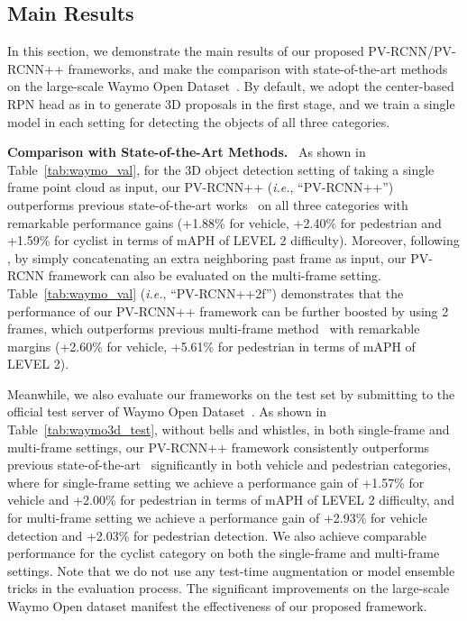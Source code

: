 \documentclass[natbib,twocolumn]{svjour3}          \smartqed  \usepackage{graphicx}
\begin{document}
\subsection{Main Results}\label{sec:main_results}
In this section, we demonstrate the main results of our proposed PV-RCNN/PV-RCNN++ frameworks, and make the comparison with state-of-the-art methods on the large-scale Waymo Open Dataset~\citep{Sun_2020_CVPR}. 
By default, we adopt the center-based RPN head as in \citep{yin2021center} to generate 3D proposals in the first stage, and we train a single model in each setting for detecting the objects of all three categories.


\noindent
\textbf{Comparison with State-of-the-Art Methods.}~
As shown in Table~\ref{tab:waymo_val}, 
for the 3D object detection setting of taking a single frame point cloud as input, 
our PV-RCNN++ (\emph{i.e.}, ``PV-RCNN++'') outperforms previous state-of-the-art works~\citep{yin2021center,shi2020part} 
on all three categories with remarkable performance gains (+1.88\% for vehicle, 
+2.40\% for pedestrian and 
+1.59\% for cyclist
in terms of mAPH of LEVEL 2 difficulty).
Moreover, following \citep{sun2021rsn}, by simply concatenating an extra neighboring past frame as input, our PV-RCNN framework can also be evaluated on the multi-frame setting. Table~\ref{tab:waymo_val} (\emph{i.e.}, ``PV-RCNN++2f'') demonstrates that the performance of our PV-RCNN++ framework can be further boosted by using 2 frames, which outperforms previous multi-frame method~\citep{sun2021rsn} with remarkable margins (+2.60\% for vehicle, +5.61\% for pedestrian in terms of mAPH of LEVEL 2). 
 
Meanwhile, we also evaluate our frameworks on the test set by submitting to the official test server of Waymo Open Dataset~\citep{Sun_2020_CVPR}. As shown in Table~\ref{tab:waymo3d_test}, without bells and whistles, in both single-frame and multi-frame settings, our PV-RCNN++ framework consistently outperforms previous state-of-the-art~\citep{yin2021center} significantly in both vehicle and pedestrian categories, where for single-frame setting we achieve a performance gain of 
+1.57\% for vehicle and +2.00\% for pedestrian 
in terms of mAPH of LEVEL 2 difficulty, and for multi-frame setting we achieve a performance gain of +2.93\% for vehicle detection and +2.03\% for pedestrian detection. 
We also achieve comparable performance for the cyclist category on both the single-frame and multi-frame settings.
Note that we do not use any test-time augmentation or model ensemble tricks in the evaluation process. 
The significant improvements on the large-scale Waymo Open dataset manifest the effectiveness of our proposed framework. 
\end{document}
